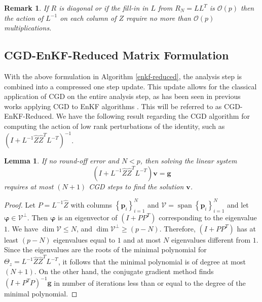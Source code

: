 \documentclass[11p]{elsarticle}
\numberwithin{equation}{section}
\newtheorem{remark}{Remark}
\newtheorem{lemma}{Lemma}
\begin{document}
\begin{remark}
    If $R$ is diagonal or if  the fill-in in $L$ from $R_N=LL^T$ is $\mathcal{O}(p)$ then the action of 
$L^{-1}$ on each column of $Z$ require no more than $\mathcal{O}(p)$ multiplications. 
\end{remark}


\subsection{CGD-EnKF-Reduced Matrix Formulation}

With the above formulation in Algorithm \ref{enkf-reduced}, the analysis step is combined into a compressed one step update.  This update allows for the classical application of CGD on the entire analysis step, as has been seen in previous works applying CGD to EnKF algorithms \cite{Bardsley2013,Bardsley2013-2}.  This will be referred to as CGD-EnKF-Reduced.  We have the following result regarding the CGD algorithm for computing the action of 
low rank perturbations of the identity, such as $\left(I+L^{-1}\widehat{Z}\widehat{Z}^TL^{-T}\right)^{-1}$.
\begin{lemma}\label{l-1} If no round-off error and $N < p$, then solving the linear system 
\[
\left(I+L^{-1} \widehat{Z} \widehat{Z}^T L^{-T}\right)\bm{v}=\bm{g}
\] 
requires at most $(N+1)$ CGD steps to find the solution $\bm{v}$.
\end{lemma}

\begin{proof} Let 
$P=L^{-1} \widehat{Z}$ with columns $\left\{\bm{p}_i\right\}_{i=1}^N$ and 
$\mathcal{V}=\operatorname{span}\left\{\bm{p}_i\right\}_{i=1}^N$ and let 
$\bm \varphi\in \mathcal{V}^{\perp}$. Then $\bm \varphi$ is an eigenvector of 
$\left(I+PP^T\right)$ corresponding to the eigenvalue $1$. We have
\(\dim \mathcal{V}\le N\), and \(\dim \mathcal{V}^\perp \ge (p-N)\). Therefore, $(I+PP^T)$ has at least $(p-N)$ eigenvalues equal to $1$ and at most $N$ eigenvalues different from $1$. 
Since the eigenvalues are the roots of the minimal polynomial for $\Theta_z=L^{-1} \widehat{Z} \widehat{Z}^T L^{-T}$, it follows that 
the minimal polynomial is of degree at most $(N+1)$. On the other hand, the conjugate gradient method finds 
$(I+P^TP)^{-1} \bm{g}$ in number of iterations less than or equal  to the degree of the minimal polynomial.  
\end{proof}
\end{document}
